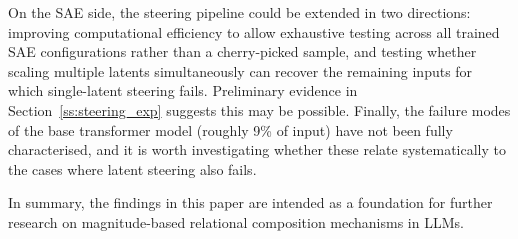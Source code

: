 On the SAE side, the steering pipeline could be extended in two 
directions: improving computational efficiency to allow exhaustive testing across all trained SAE configurations rather than a cherry-picked sample, and testing whether scaling multiple latents simultaneously can recover the remaining inputs for which single-latent steering fails. 
Preliminary evidence in Section~\ref{ss:steering_exp} suggests this may be possible. 
Finally, the failure modes of the base transformer model (roughly 9\% of input) have not been fully characterised, and it is worth investigating whether these relate systematically to the cases where latent steering also fails.

In summary, the findings in this paper are intended as a foundation for further research on magnitude-based relational composition mechanisms in LLMs.